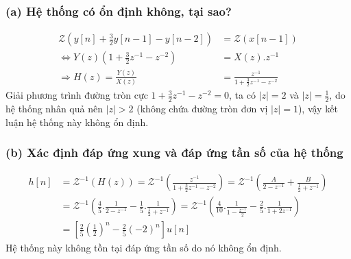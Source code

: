 \documentclass{article}
\begin{document}
\subsubsection*{(a) Hệ thống có ổn định không, tại sao?}
\begin{equation*}
\begin{split}
\mathscr{Z}(y[n]+\frac{3}{2}y[n-1]-y[n-2])&=\mathscr{Z}(x[n-1])\\\Leftrightarrow Y(z)\left(1+\frac{3}{2}z^{-1}-z^{-2}\right)&=X(z).z^{-1}\\\Rightarrow H(z)=\frac{Y(z)}{X(z)}&=\frac{z^{-1}}{1+\frac{3}{2}z^{-1}-z^{-2}}
\end{split}
\end{equation*}
Giải phương trình đường tròn cực $1+\frac{3}{2}z^{-1}-z^{-2}=0$, ta có $|z|=2$ và $|z|=\frac{1}{2}$, do hệ thống nhân quả nên $|z|>2$ (không chứa đường tròn đơn vị $|z|=1$), vậy kết luận hệ thống này không ổn định.
\subsubsection*{(b) Xác định đáp ứng xung và đáp ứng tần số của hệ thống}
\begin{equation*}
\begin{split}
h[n]&=\mathscr{Z}^{-1}(H(z))=\mathscr{Z}^{-1}\left(\frac{z^{-1}}{1+\frac{3}{2}z^{-1}-z^{-2}}\right)=\mathscr{Z}^{-1}\left(\frac{A}{2-z^{-1}}+\frac{B}{\frac{1}{2}+z^{-1}}\right)\\&=\mathscr{Z}^{-1}\left(\frac{4}{5}.\frac{1}{2-z^{-1}}-\frac{1}{5}.\frac{1}{\frac{1}{2}+z^{-1}}\right)=\mathscr{Z}^{-1}\left(\frac{4}{10}.\frac{1}{1-\frac{z^{-1}}{2}}-\frac{2}{5}.\frac{1}{1+2z^{-1}}\right)\\&=\left[\frac{2}{5}\left(\frac{1}{2}\right)^{n}-\frac{2}{5}(-2)^{n}\right]u[n]
\end{split}
\end{equation*}
Hệ thống này không tồn tại đáp ứng tần số do nó không ổn định.
\end{document}

